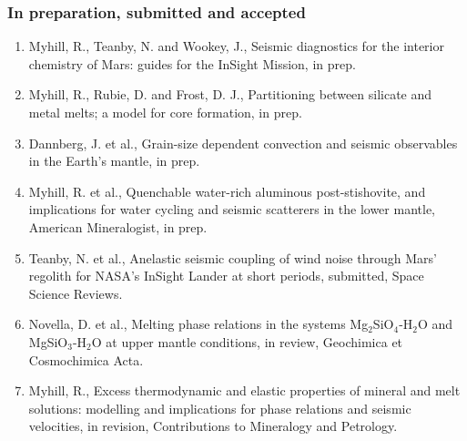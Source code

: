 \documentclass[11pt,twoside,a4paper]{article}
\begin{document}
\subsubsection*{In preparation, submitted and accepted}
\small \sloppy
\begin{enumerate}
\item Myhill, R., Teanby, N. and Wookey, J., Seismic diagnostics for the interior chemistry of Mars: guides for the InSight Mission, in prep.
\item Myhill, R., Rubie, D. and Frost, D. J., Partitioning between silicate and metal melts; a model for core formation, in prep.
\item Dannberg, J. et al., Grain-size dependent convection and seismic observables in the Earth's mantle, in prep.
\item Myhill, R. et al., Quenchable water-rich aluminous post-stishovite, and implications for water cycling and seismic scatterers in the lower mantle, American Mineralogist, in prep.
\item Teanby, N. et al., Anelastic seismic coupling of wind noise through Mars’ regolith for NASA’s InSight Lander at short periods, submitted, Space Science Reviews.
\item Novella, D. et al., Melting phase relations in the systems Mg$_2$SiO$_4$-H$_2$O and MgSiO$_3$-H$_2$O at upper mantle conditions, in review, Geochimica et Cosmochimica Acta.
\item Myhill, R., Excess thermodynamic and elastic properties of mineral and melt solutions: modelling and implications for phase relations and seismic velocities, in revision, Contributions to Mineralogy and Petrology.
\end{enumerate}
\end{document}

